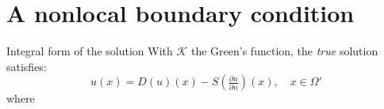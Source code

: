 \documentclass{beamer}
\begin{document}
\section{A nonlocal boundary condition}

\begin{frame}{Integral form of the solution}
With $\mathcal{K}$ the Green's function, the \emph{true} solution satisfies:
  \begin{equation*}
      u(x) = D(u)(x) - S(\tfrac{\partial u}{\partial n})(x), \quad x \in\Omega'
  \end{equation*}
  where
\end{frame}
\end{document}
